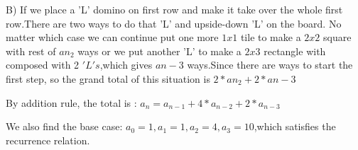 \documentclass{article}
\begin{document}
B) If we place a 'L' domino on first row and make it take over the whole first row.There are two ways to do that 'L' and upside-down 'L' on the board. No matter which case we can continue put one more $1x1$ tile to make a $2x2$ square with rest of $a{n_2}$ ways or we put another 'L' to make a $2x3$ rectangle with composed with 2 $'L's$,which gives $a{n-3}$ ways.Since there are ways to start the first step, so the grand total of this situation is $2*a{n_2}+2*a{n-3}$

By addition rule, the total is : $a_n=a_{n-1}+4*a_{n-2}+2*a_{n-3}$

We also find the base case:
$a_0=1,a_1=1,a_2=4,a_3=10$,which satisfies the recurrence relation.
\end{document}
